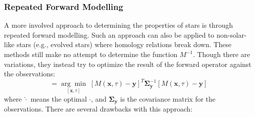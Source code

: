 \subsubsection*{Repeated Forward Modelling} 
A more involved approach to determining the properties of stars is through repeated forward modelling. 
Such an approach can also be applied to non-solar-like stars (e.g., evolved stars) where homology relations break down. 
These methods still make no attempt to determine the function $M^{-1}$. 
Though there are variations, they instead try to optimize the result of the forward operator against the observations: 
\begin{equation}
    [\hat{\mathbf x}, \hat\tau]
    =
    \underset{[\mathbf x, \tau]}{\arg\min}\; \left[
        M(\mathbf x, \tau)
        -
        \mathbf y
    \right]^T
    \boldsymbol{\Sigma}_{\mathbf y}^{-1}
    \left[
        M(\mathbf x, \tau)
        -
        \mathbf y
    \right]
\end{equation}
where $\hat\cdot$ means the optimal $\cdot$, and $\boldsymbol\Sigma_{\mathbf y}$ is the covariance matrix for the observations. 
There are several drawbacks with this approach: 
